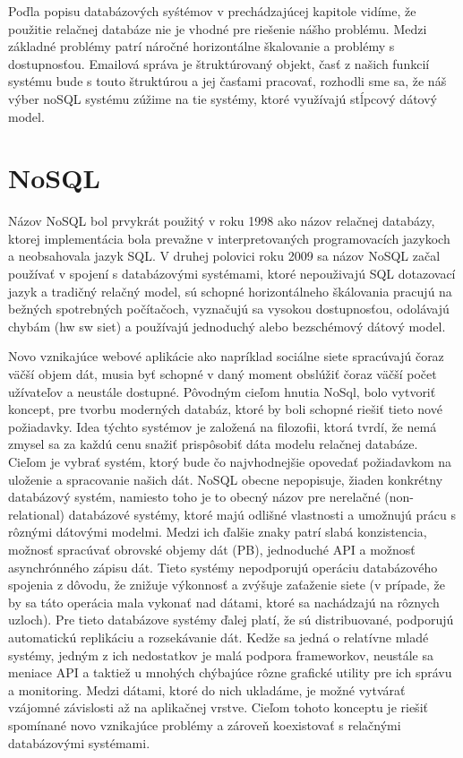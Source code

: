 \documentclass[11pt,twoside,a4paper]{book}
\begin{document}
Poďla popisu databázových syśtémov v prechádzajúcej kapitole vidíme, že použitie relačnej databáze nie je vhodné pre riešenie nášho problému. Medzi základné problémy patrí náročné horizontálne škalovanie a problémy s dostupnosťou. Emailová správa je štruktúrovaný objekt, časť z našich funkcií systému bude s touto štruktúrou a jej časťami pracovať, rozhodli sme sa, že náš výber noSQL systému zúžime na tie systémy, ktoré využívajú stĺpcový dátový model.



\chapter{NoSQL}

Názov NoSQL bol prvykrát použitý v roku 1998 ako názov relačnej databázy, ktorej implementácia bola prevažne v interpretovaných programovacích jazykoch a neobsahovala jazyk SQL. V druhej polovici roku 2009 \cite{nosqlGoogle} sa názov NoSQL začal používať v spojení s databázovými systémami, ktoré nepouživajú SQL dotazovací jazyk a tradičný relačný model, sú schopné horizontálneho škálovania pracujú na bežných spotrebných počítačoch, vyznačujú sa vysokou dostupnosťou, odolávajú chybám (hw sw siet) a používajú jednoduchý alebo bezschémový dátový model.

Novo vznikajúce webové aplikácie ako napríklad sociálne siete spracúvajú čoraz väčší objem dát, musia byť schopné v daný moment obslúžiť čoraz väčší počet užívateľov a neustále dostupné. Pôvodným cieľom hnutia NoSql, bolo vytvoriť koncept, pre tvorbu moderných databáz, ktoré by boli schopné riešiť tieto nové požiadavky. Idea týchto systémov je založená na filozofii, ktorá tvrdí, že nemá zmysel sa za každú cenu snažiť prispôsobiť dáta modelu relačnej databáze. Cieľom je vybrať systém, ktorý bude čo najvhodnejšie opovedať požiadavkom na uloženie a spracovanie našich dát. NoSQL obecne nepopisuje, žiaden konkrétny databázový systém, namiesto toho je to obecný názov pre nerelačné (non-relational) databázové systémy, ktoré majú odlišné vlastnosti a umožnujú prácu s rôznými dátovými modelmi. Medzi ich ďalšie znaky patrí slabá konzistencia, možnosť spracúvať obrovské objemy dát (PB), jednoduché API a možnosť asynchrónného zápisu dát. Tieto systémy nepodporujú operáciu databázového spojenia z dôvodu, že znižuje výkonnosť a zvýšuje zaťaženie siete (v prípade, že by sa táto operácia mala vykonať nad dátami, ktoré sa nachádzajú na rôznych uzloch). Pre tieto databázove systémy ďalej platí, že sú distribuované, podporujú automatickú replikáciu a rozsekávanie dát. Kedže sa jedná o relatívne mladé systémy, jedným z ich nedostatkov je malá podpora frameworkov, neustále sa meniace API a taktiež u mnohých chýbajúce rôzne grafické utility pre ich správu a monitoring. Medzi dátami, ktoré do nich ukladáme, je možné vytvárať vzájomné závislosti až na aplikačnej vrstve. Cieľom tohoto konceptu je riešiť spomínané novo vznikajúce problémy a zároveň koexistovať s relačnými databázovými  systémami.
\end{document}
